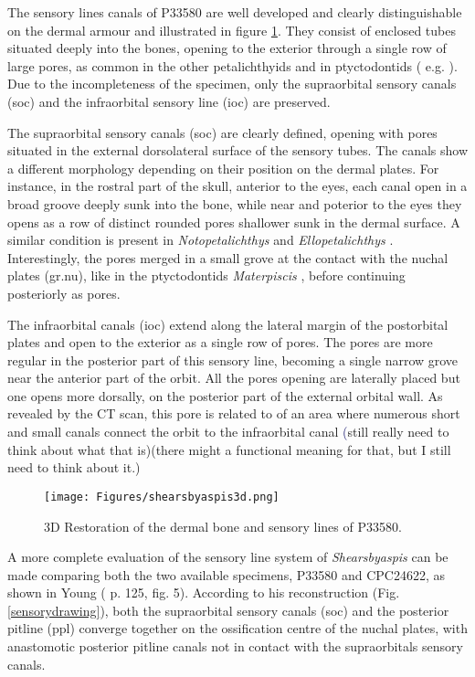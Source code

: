 \documentclass[12pt,letterpaper]{article}
\begin{document}
The sensory lines canals of P33580 are well developed and clearly distinguishable on the dermal armour and illustrated in figure \ref{sensory3D}. They consist of enclosed tubes situated deeply into the bones, opening to the exterior through a single row of large pores, as common in the other petalichthyids and in ptyctodontids ( e.g. \citealt{Stensio1925,Miles1967,Denison1978,Young1978,Young1985,Forey1986a,Zhu1991,Trinajstic2012,pan2015new}). Due to the incompleteness of the specimen, only the supraorbital sensory canals (soc) and the infraorbital sensory line (ioc) are preserved.

The supraorbital sensory canals (soc) are clearly defined, opening with pores situated in the external dorsolateral surface of the sensory tubes. The canals show a different morphology depending on their position on the dermal plates. For instance, in the rostral part of the skull, anterior to the eyes, each canal open in a broad groove deeply sunk into the bone, while near and poterior to the eyes they opens as a row of distinct rounded pores shallower sunk in the dermal surface.   A similar condition is present in \textit{Notopetalichthys} \cite{Woodward1941} and \textit{Ellopetalichthys} \cite{Ørvig1957}. Interestingly, the pores merged in a small grove at the contact with the nuchal plates (gr.nu), like in the ptyctodontids \textit{Materpiscis} \cite{Trinajstic2012}, before continuing posteriorly as pores.

The infraorbital canals (ioc) extend along the lateral margin of the postorbital plates and open to the exterior as a single row of pores. The pores are more regular in the posterior part of this sensory line, becoming a single narrow grove near the anterior part of the orbit. All the pores opening are laterally placed but one opens more dorsally, on the posterior part of the external orbital wall. As revealed by the CT scan, this pore is related to of an area where numerous short and small canals connect the orbit to the infraorbital canal  \textcolor{MidnightBlue}(still really need to think about what that is)(there might a functional meaning for that, but I still need to think about it.)

\begin{figure}[!h]
\centering
    \texttt{[image: Figures/shearsbyaspis3d.png]}
\caption{\footnotesize{3D Restoration of the dermal bone and sensory lines of P33580.}}
\label{sensory3D}
\end{figure}

A more complete evaluation of the sensory line system of \textit{Shearsbyaspis} can be made comparing both the two available specimens, P33580 and  CPC24622, as shown in Young (\citealt{Young1985} p. 125, fig. 5). According to his reconstruction (Fig. \ref{sensorydrawing}), both the supraorbital sensory canals (soc) and the posterior pitline (ppl) converge together on the ossification centre of the nuchal plates, with anastomotic posterior pitline canals not in contact with the supraorbitals sensory canals.
\end{document}
